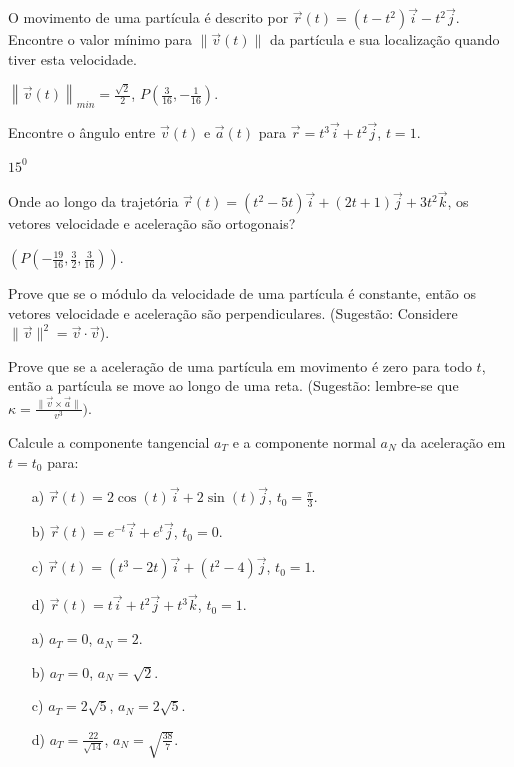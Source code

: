 \begin{exer}
O movimento de uma partícula é descrito por $\vec{r}(t)=(t-t^2)\vec{i}-t^2\vec{j}$. Encontre o valor mínimo  para $\|\vec{v}(t)\|$ da partícula e sua localização quando tiver esta velocidade. 
\end{exer}
\begin{resp}
 $\left\|\vec{v}(t)\right\|_{min}=\frac{\sqrt{2}}{2}$, $P\left(\frac{3}{16},-\frac{1}{16}\right)$.
 \end{resp}
\begin{exer}
 Encontre o ângulo entre $\vec{v}(t)$ e $\vec{a}(t)$ para $\vec{r}=t^3\vec{i}+t^2\vec{j}$, $t=1$.
\end{exer}
\begin{resp}
 $15^0$
\end{resp}
\begin{exer}
 Onde ao longo da trajetória $\vec{r}(t)=(t^2-5t)\vec{i}+(2t+1)\vec{j}+3t^2\vec{k}$, os vetores velocidade e aceleração são ortogonais?
\end{exer}
\begin{resp}
 $\left(P\left(-\frac{19}{16},\frac{3}{2},\frac{3}{16}\right)\right)$.
\end{resp}
\begin{exer}
 Prove que se o módulo da velocidade de uma partícula é constante, então os vetores velocidade e aceleração são perpendiculares. (Sugestão: Considere $\|\vec{v}\|^2=\vec{v}\cdot\vec{v}$).
\end{exer}
\begin{exer}Prove que se a aceleração de uma partícula em movimento é zero para todo $t$, então a partícula se move ao longo de uma reta.  (Sugestão: lembre-se que $\kappa=\frac{\|\vec{v}\times \vec{a}\|}{v^3} )$.
\end{exer}
\begin{exer}Calcule a componente tangencial $a_T$ e a componente normal $a_N$ da aceleração em $t=t_0$ para:
\begin{itemize}
 \item[a)] $\vec{r}(t)=2\cos(t)\vec{i}+2\sin(t)\vec{j}$, $t_0=\frac{\pi}{3}$.
 \item[b)] $\vec{r}(t)=e^{-t}\vec{i}+e^{t}\vec{j}$, $t_0=0$.
 \item[c)] $\vec{r}(t)=(t^3-2t)\vec{i}+(t^2-4)\vec{j}$, $t_0=1$.
 \item[d)] $\vec{r}(t)=t\vec{i}+t^2\vec{j}+t^3\vec{k}$, $t_0=1$.
\end{itemize}
\end{exer}
\begin{resp}
\begin{itemize}
 \item[a)] $a_T=0$, $a_N=2$.
 \item[b)] $a_T=0$, $a_N=\sqrt{2}$.
 \item[c)] $a_T=2\sqrt{5}$, $a_N=2\sqrt{5}$.
 \item[d)] $a_T=\frac{22}{\sqrt{14}}$, $a_N=\sqrt{\frac{38}{7}}$.
\end{itemize}
 
\end{resp}
